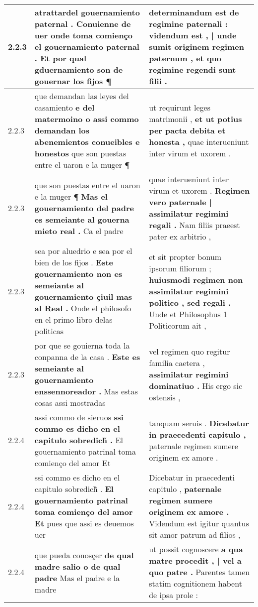 \begin{tabular}{|p{1cm}|p{6.5cm}|p{6.5cm}|}
2.2.3 & atrattardel gouernamiento paternal . \textbf{ Conuienne de uer onde toma comienço el gouernamiento paternal . } Et por qual gduernamiento son de gouernar los fijos ¶ & determinandum est de regimine paternali : \textbf{ videndum est , | unde sumit originem regimen paternum , } et quo regimine regendi sunt filii . \\\hline
2.2.3 & que demandan las leyes del casamiento \textbf{ e del matermoino o assi commo demandan los abenemientos conueibles e honestos } que son puestas entre el uaron e la muger ¶ & ut requirunt leges matrimonii , \textbf{ et ut potius per pacta debita et honesta , } quae interueniunt inter virum et uxorem . \\\hline
2.2.3 & que son puestas entre el uaron e la muger ¶ \textbf{ Mas el gouernamiento del padre es semeiante al gouerna mieto real . } Ca el padre & quae interueniunt inter virum et uxorem . \textbf{ Regimen vero paternale | assimilatur regimini regali . } Nam filiis praeest pater ex arbitrio , \\\hline
2.2.3 & sea por aluedrio e sea por el bien de los fijos . \textbf{ Este gouernamiento non es semeiante al gouernamiento çiuil mas al Real . } Onde el philosofo en el primo libro delas politicas & et sit propter bonum ipsorum filiorum ; \textbf{ huiusmodi regimen non assimilatur regimini politico , sed regali . } Unde et Philosophus 1 Politicorum ait , \\\hline
2.2.3 & por que se gouierna toda la conpanna de la casa . \textbf{ Este es semeiante al gouernamiento enssennoreador . } Mas estas cosas assi mostradas & vel regimen quo regitur familia caetera , \textbf{ assimilatur regimini dominatiuo . } His ergo sic ostensis , \\\hline
2.2.4 & assi commo de sieruos \textbf{ ssi commo es dicho en el capitulo sobredich̃ . } El gouernamiento patrinal toma comienço del amor Et & tanquam seruis . \textbf{ Dicebatur in praecedenti capitulo , } paternale regimen sumere originem ex amore . \\\hline
2.2.4 & ssi commo es dicho en el capitulo sobredich̃ . \textbf{ El gouernamiento patrinal toma comienço del amor Et } pues que assi es deuemos uer & Dicebatur in praecedenti capitulo , \textbf{ paternale regimen sumere originem ex amore . } Videndum est igitur quantus sit amor patrum ad filios , \\\hline
2.2.4 & que pueda conosçer \textbf{ de qual madre salio o de qual padre } Mas el padre e la madre & ut possit cognoscere \textbf{ a qua matre procedit , | vel a quo patre . } Parentes tamen statim cognitionem habent de ipsa prole : \\\hline

\end{tabular}
